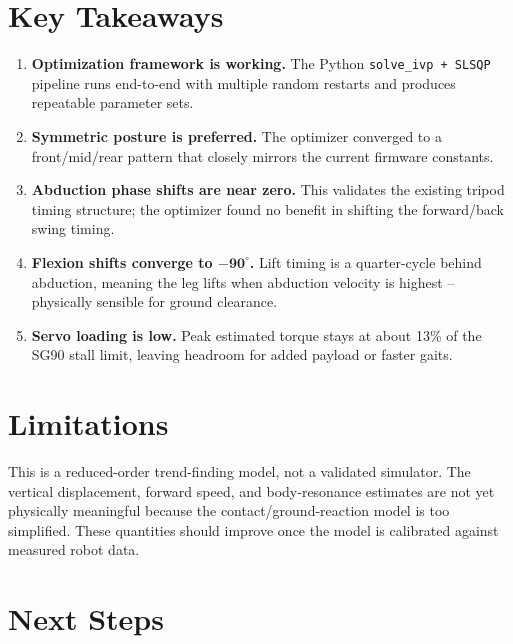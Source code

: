 \documentclass[11pt]{article}
\begin{document}
\section{Key Takeaways}

\begin{enumerate}
    \item \textbf{Optimization framework is working.} The Python \texttt{solve\_ivp\,+\,SLSQP} pipeline runs end-to-end with multiple random restarts and produces repeatable parameter sets.
    \item \textbf{Symmetric posture is preferred.} The optimizer converged to a front/mid/rear pattern that closely mirrors the current firmware constants.
    \item \textbf{Abduction phase shifts are near zero.} This validates the existing tripod timing structure; the optimizer found no benefit in shifting the forward/back swing timing.
    \item \textbf{Flexion shifts converge to $\boldsymbol{-90^\circ}$.} Lift timing is a quarter-cycle behind abduction, meaning the leg lifts when abduction velocity is highest -- physically sensible for ground clearance.
    \item \textbf{Servo loading is low.} Peak estimated torque stays at about 13\% of the SG90 stall limit, leaving headroom for added payload or faster gaits.
\end{enumerate}

\section{Limitations}

This is a reduced-order trend-finding model, not a validated simulator. The vertical displacement, forward speed, and body-resonance estimates are not yet physically meaningful because the contact/ground-reaction model is too simplified. These quantities should improve once the model is calibrated against measured robot data.

\section{Next Steps}
\end{document}
